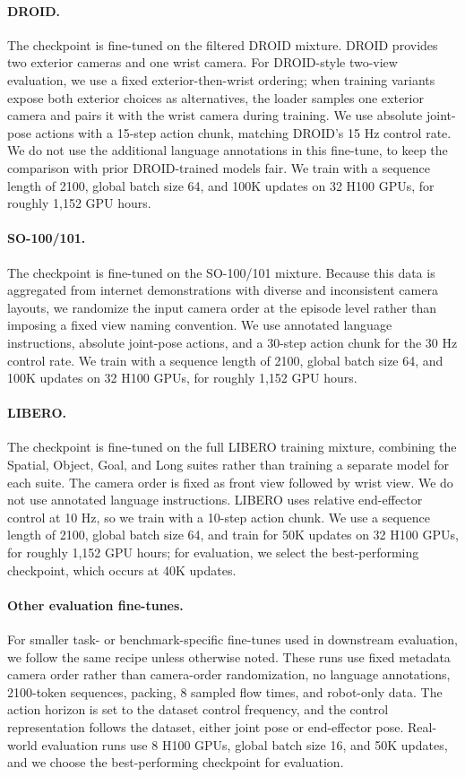 \paragraph{DROID.}
The \molmoacttdroid checkpoint is fine-tuned on the filtered DROID mixture. DROID provides two exterior cameras and one wrist camera. For DROID-style two-view evaluation, we use a fixed exterior-then-wrist ordering; when training variants expose both exterior choices as alternatives, the loader samples one exterior camera and pairs it with the wrist camera during training. We use absolute joint-pose actions with a 15-step action chunk, matching DROID's 15 Hz control rate. We do not use the additional language annotations in this fine-tune, to keep the comparison with prior DROID-trained models fair. We train with a sequence length of 2100, global batch size 64, and 100K updates on 32 H100 GPUs, for roughly 1,152 GPU hours.

\paragraph{SO-100/101.}
The \molmoacttso checkpoint is fine-tuned on the SO-100/101 mixture. Because this data is aggregated from internet demonstrations with diverse and inconsistent camera layouts, we randomize the input camera order at the episode level rather than imposing a fixed view naming convention. We use annotated language instructions, absolute joint-pose actions, and a 30-step action chunk for the 30 Hz control rate. We train with a sequence length of 2100, global batch size 64, and 100K updates on 32 H100 GPUs, for roughly 1,152 GPU hours.

\paragraph{LIBERO.}
The \molmoacttlib checkpoint is fine-tuned on the full LIBERO training mixture, combining the Spatial, Object, Goal, and Long suites rather than training a separate model for each suite. The camera order is fixed as front view followed by wrist view. We do not use annotated language instructions. LIBERO uses relative end-effector control at 10 Hz, so we train with a 10-step action chunk. We use a sequence length of 2100, global batch size 64, and train for 50K updates on 32 H100 GPUs, for roughly 1,152 GPU hours; for evaluation, we select the best-performing checkpoint, which occurs at 40K updates.

\paragraph{Other evaluation fine-tunes.}
For smaller task- or benchmark-specific fine-tunes used in downstream evaluation, we follow the same recipe unless otherwise noted. These runs use fixed metadata camera order rather than camera-order randomization, no language annotations, 2100-token sequences, packing, 8 sampled flow times, and robot-only data. The action horizon is set to the dataset control frequency, and the control representation follows the dataset, either joint pose or end-effector pose. Real-world evaluation runs use 8 H100 GPUs, global batch size 16, and 50K updates, and we choose the best-performing checkpoint for evaluation.

